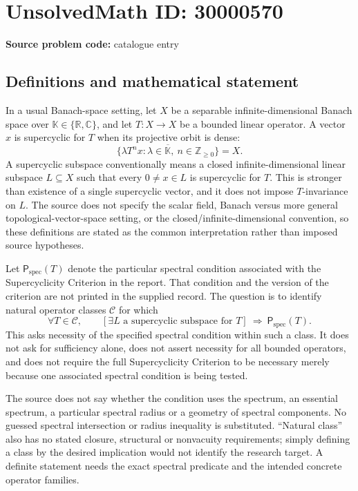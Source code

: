 \documentclass[11pt]{article}
\newcommand{\Z}{\mathbb{Z}}
\newcommand{\R}{\mathbb{R}}
\newcommand{\C}{\mathbb{C}}
\begin{document}
\section*{UnsolvedMath ID: 30000570}
\textbf{Source problem code:} catalogue entry
\subsection{Definitions and mathematical statement}
In a usual Banach-space setting, let \(X\) be a separable infinite-dimensional Banach space over \(\mathbb K\in\{\R,\C\}\), and let \(T:X\to X\) be a bounded linear operator. A vector \(x\) is supercyclic for \(T\) when its projective orbit is dense:
\[
 \overline{\{\lambda T^n x:\lambda\in\mathbb K,\ n\in\Z_{\geq0}\}}=X.
\]
A supercyclic subspace conventionally means a closed infinite-dimensional linear subspace \(L\subseteq X\) such that every \(0\ne x\in L\) is supercyclic for \(T\). This is stronger than existence of a single supercyclic vector, and it does not impose \(T\)-invariance on \(L\). The source does not specify the scalar field, Banach versus more general topological-vector-space setting, or the closed/infinite-dimensional convention, so these definitions are stated as the common interpretation rather than imposed source hypotheses.

Let \(\mathsf P_{\mathrm{spec}}(T)\) denote the particular spectral condition associated with the Supercyclicity Criterion in the report. That condition and the version of the criterion are not printed in the supplied record. The question is to identify natural operator classes \(\mathcal C\) for which
\[
 \forall T\in\mathcal C,\qquad
 [\exists L\text{ a supercyclic subspace for }T]
 \ \Longrightarrow\ \mathsf P_{\mathrm{spec}}(T).
\]
This asks necessity of the specified spectral condition within such a class. It does not ask for sufficiency alone, does not assert necessity for all bounded operators, and does not require the full Supercyclicity Criterion to be necessary merely because one associated spectral condition is being tested.

The source does not say whether the condition uses the spectrum, an essential spectrum, a particular spectral radius or a geometry of spectral components. No guessed spectral intersection or radius inequality is substituted. ``Natural class'' also has no stated closure, structural or nonvacuity requirements; simply defining a class by the desired implication would not identify the research target. A definite statement needs the exact spectral predicate and the intended concrete operator families.
\end{document}
